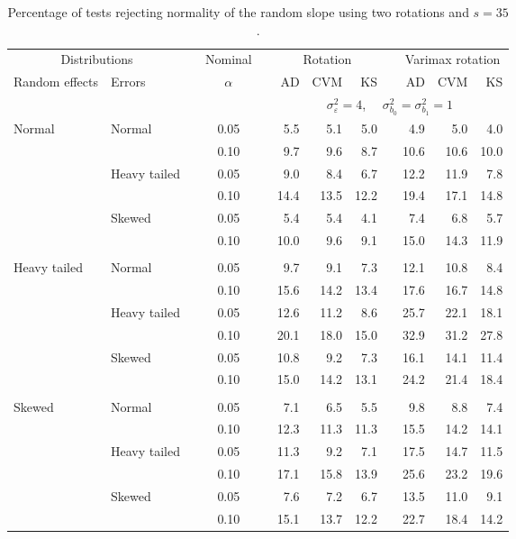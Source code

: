\begin{table}[ht]
\centering
\caption{\label{tab:fixedsimb135} Percentage of tests rejecting normality of the random slope using two rotations and $s = 35$.}
\begin{scriptsize}
\begin{tabular}{ll p{.1cm} c p{.1cm} rrr p{.1cm} rrr}
  \hline
  \multicolumn{2}{c}{Distributions}& & Nominal & &  \multicolumn{3}{c}{Rotation} & & \multicolumn{3}{c}{Varimax rotation} \\ \cline{1-2} \cline{6-8} \cline{10-12}   
  Random effects & Errors & & $\alpha$ & & AD & CVM & KS & & AD & CVM & KS \\ 
   \hline
& && && \multicolumn{7}{c}{$\sigma_{\varepsilon}^2 = 4$, \ \ $\sigma_{b_0}^2 = \sigma_{b_1}^2 = 1$} \\ \cline{6-12}
\rowcolor{gray!20} Normal & Normal &  & 0.05 &  & 5.5 & 5.1 & 5.0 &  & 4.9 & 5.0 & 4.0 \\ 
\rowcolor{gray!20}    &  &  & 0.10 &  & 9.7 & 9.6 & 8.7 &  & 10.6 & 10.6 & 10.0 \\ 
\rowcolor{gray!20}    & Heavy tailed &  & 0.05 &  & 9.0 & 8.4 & 6.7 &  & 12.2 & 11.9 & 7.8 \\ 
\rowcolor{gray!20}    &  &  & 0.10 &  & 14.4 & 13.5 & 12.2 &  & 19.4 & 17.1 & 14.8 \\ 
\rowcolor{gray!20}    & Skewed &  & 0.05 &  & 5.4 & 5.4 & 4.1 &  & 7.4 & 6.8 & 5.7 \\ 
\rowcolor{gray!20}    &  &  & 0.10 &  & 10.0 & 9.6 & 9.1 &  & 15.0 & 14.3 & 11.9 \\ 
&&&&&&&&&&&\\
  Heavy tailed & Normal &  & 0.05 &  & 9.7 & 9.1 & 7.3 &  & 12.1 & 10.8 & 8.4 \\ 
   &  &  & 0.10 &  & 15.6 & 14.2 & 13.4 &  & 17.6 & 16.7 & 14.8 \\ 
   & Heavy tailed &  & 0.05 &  & 12.6 & 11.2 & 8.6 &  & 25.7 & 22.1 & 18.1 \\ 
   &  &  & 0.10 &  & 20.1 & 18.0 & 15.0 &  & 32.9 & 31.2 & 27.8 \\ 
   & Skewed &  & 0.05 &  & 10.8 & 9.2 & 7.3 &  & 16.1 & 14.1 & 11.4 \\ 
   &  &  & 0.10 &  & 15.0 & 14.2 & 13.1 &  & 24.2 & 21.4 & 18.4 \\ 
&&&&&&&&&&&\\
  Skewed & Normal &  & 0.05 &  & 7.1 & 6.5 & 5.5 &  & 9.8 & 8.8 & 7.4 \\ 
   &  &  & 0.10 &  & 12.3 & 11.3 & 11.3 &  & 15.5 & 14.2 & 14.1 \\ 
   & Heavy tailed &  & 0.05 &  & 11.3 & 9.2 & 7.1 &  & 17.5 & 14.7 & 11.5 \\ 
   &  &  & 0.10 &  & 17.1 & 15.8 & 13.9 &  & 25.6 & 23.2 & 19.6 \\ 
   & Skewed &  & 0.05 &  & 7.6 & 7.2 & 6.7 &  & 13.5 & 11.0 & 9.1 \\ 
   &  &  & 0.10 &  & 15.1 & 13.7 & 12.2 &  & 22.7 & 18.4 & 14.2 \\ 


\end{tabular}
\end{scriptsize}
\end{table}
